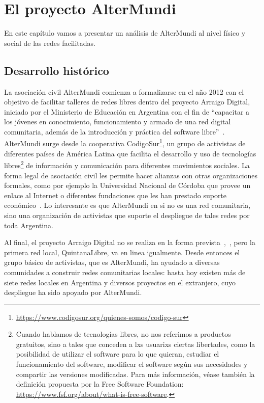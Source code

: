 \section{El proyecto AlterMundi}

En este capítulo vamos a presentar un análisis de AlterMundi al nivel físico y social de las redes facilitadas.

\subsection{Desarrollo histórico}

La asociación civil AlterMundi comienza a formalizarse en el año 2012 con el objetivo de facilitar talleres de redes libres dentro del proyecto Arraigo Digital, iniciado por el Ministerio de Educación en Argentina con el fin de ``capacitar a los jóvenes en conocimiento, funcionamiento y armado de una red digital comunitaria, además de la introducción y práctica del software libre''~\autocite{Piccoli2015}.
AlterMundi surge desde la cooperativa CodigoSur\footnote{\url{https://www.codigosur.org/quienes-somos/codigo-sur}}, un grupo de activistas de diferentes países de América Latina que facilita el desarrollo y uso de tecnologías libres\footnote{Cuando
 hablamos de tecnologías libres, no nos referimos a productos gratuitos, sino a tales que conceden a lxs usuarixs ciertas libertades, como la posibilidad de utilizar el software para lo que quieran, estudiar el funcionamiento del software, modificar el software según sus necesidades y compartir las versiones modificadas.
Para más información, véase también la definición propuesta por la Free Software Foundation: \url{https://www.fsf.org/about/what-is-free-software}.}
de información y comunicación para diferentes movimientos sociales.
La forma legal de asociación civil les permite hacer alianzas con otras organizaciones formales, como por ejemplo la Universidad Nacional de Córdoba que provee un enlace al Internet o diferentes fundaciones que les han prestado suporte económico~\autocite{Vaseva2016a}.
Lo interesante es que AlterMundi en si no es una red comunitaria, sino una organización de activistas que suporte el despliegue de tales redes por toda Argentina.

Al final, el proyecto Arraigo Digital no se realiza en la forma prevista~\autocite{Vaseva2016a},~\autocite{Piccoli2015}, pero la primera red local, QuintanaLibre, va en linea igualmente.
Desde entonces el grupo básico de activistas, que es AlterMundi, ha ayudado a diversas comunidades a construir redes comunitarias locales:
hasta hoy existen más de siete redes locales en Argentina y diversos proyectos en el extranjero, cuyo despliegue ha sido apoyado por AlterMundi.

